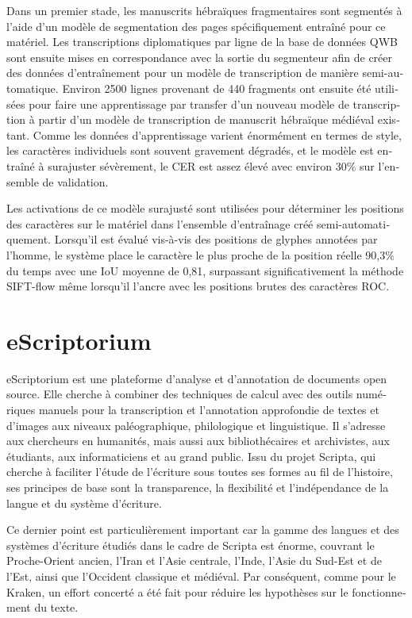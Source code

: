 \begin{french}
Dans un premier stade, les manuscrits hébraïques fragmentaires sont segmentés à
l'aide d'un modèle de segmentation des pages spécifiquement entraîné pour ce
matériel. Les transcriptions diplomatiques par ligne de la base de données QWB
sont ensuite mises en correspondance avec la sortie du segmenteur afin de créer
des données d'entraînement pour un modèle de transcription de manière
semi-automatique.  Environ 2500 lignes provenant de 440 fragments ont ensuite
été utilisées pour faire une apprentissage par transfer d'un nouveau modèle de
transcription à partir d'un modèle de transcription de manuscrit hébraïque
médiéval existant.  Comme les données d'apprentissage varient énormément en
termes de style, les caractères individuels sont souvent gravement dégradés, et
le modèle est entraîné à surajuster sévèrement, le CER est assez élevé avec
environ 30\% sur l'ensemble de validation.

Les activations de ce modèle surajusté sont utilisées pour déterminer les
positions des caractères sur le matériel dans l'ensemble d'entraînage créé
semi-automatiquement. Lorsqu'il est évalué vis-à-vis des positions de glyphes
annotées par l'homme, le système place le caractère le plus proche de la
position réelle 90,3\% du temps avec une IoU moyenne de 0,81, surpassant
significativement la méthode SIFT-flow même lorsqu'il l'ancre avec les
positions brutes des caractères ROC.

\section{eScriptorium}

eScriptorium est une plateforme d'analyse et d'annotation de documents open
source. Elle cherche à combiner des techniques de calcul avec des outils
numériques manuels pour la transcription et l'annotation approfondie de textes
et d'images aux niveaux paléographique, philologique et linguistique. Il
s'adresse aux chercheurs en humanités, mais aussi aux bibliothécaires
et archivistes, aux étudiants, aux informaticiens et au grand public. Issu du
projet Scripta, qui cherche à faciliter l'étude de l'écriture sous toutes ses
formes au fil de l'histoire, ses principes de base sont la transparence, la
flexibilité et l'indépendance de la langue et du système d'écriture.

Ce dernier point est particulièrement important car la gamme des langues et des
systèmes d'écriture étudiés dans le cadre de Scripta est énorme, couvrant le
Proche-Orient ancien, l'Iran et l'Asie centrale, l'Inde, l'Asie du Sud-Est et
de l'Est, ainsi que l'Occident classique et médiéval. Par conséquent, comme
pour le Kraken, un effort concerté a été fait pour réduire les hypothèses sur
le fonctionnement du texte.


\end{french}
